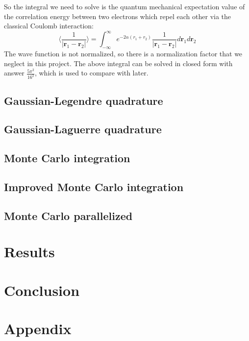 \documentclass[12pt,a4paper,english]{article}
\begin{document}
So the integral we need to solve is the quantum mechanical expectation value of the correlation energy between two electrons which repel each other via the classical Coulomb interaction:
\begin{equation}
\langle\frac{1}{|\textbf{r}_1-\textbf{r}_2|}\rangle=\int_{-\infty}^{\infty}e^{-2\alpha(r_1+r_2)}\frac{1}{|\textbf{r}_1-\textbf{r}_2|}d\textbf{r}_1d\textbf{r}_2
\end{equation}
The wave function is not normalized, so there is a normalization factor that we neglect in this project. The above integral can be solved in closed form with answer $\frac{5\pi^2}{16^2}$, which is used to compare with later.

\subsection{Gaussian-Legendre quadrature}
\subsection{Gaussian-Laguerre quadrature}
\subsection{Monte Carlo integration}
\subsection{Improved Monte Carlo integration}
\subsection{Monte Carlo parallelized}
\section{Results}
\section{Conclusion}
\appendix
\section{Appendix}
\label{sect:appendix}
\end{document}
